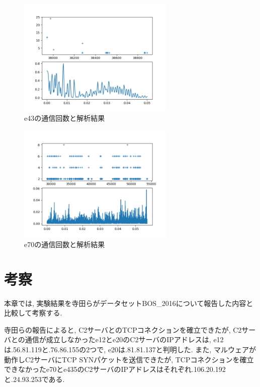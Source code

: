 \documentclass[twocolumn,10pt]{ltjsarticle}
\begin{document}
\begin{figure}[htbp]
    \centering

    \includegraphics[width=7.5cm]{images/【実験】BOS_2016の周期分析結果の比較/e43.png}

    \caption{e43の通信回数と解析結果}
    \label{fig:e43_result}
\end{figure}

\begin{figure}[htbp]
    \centering

    \includegraphics[width=7.5cm]{images/【実験】BOS_2016の周期分析結果の比較/e70.png}

    \caption{e70の通信回数と解析結果}
    \label{fig:e70_result}
\end{figure}

\section{考察}
本章では, 実験結果を寺田らがデータセットBOS\_2016について報告した内容\cite{weko_175829_1}と比較して考察する. 

寺田らの報告によると, C2サーバとのTCPコネクションを確立できたが, C2サーバとの通信が成立しなかったe12とe20のC2サーバのIPアドレスは, e12は\ast\ast\ast.56.81.119と\ast\ast\ast.76.86.155の2つで, e20は\ast\ast\ast.81.81.137と判明した. また, マルウェアが動作しC2サーバにTCP SYNパケットを送信できたが, TCPコネクションを確立できなかったe70とe435のC2サーバのIPアドレスはそれぞれ\ast\ast\ast.106.20.192と\ast\ast\ast.24.93.253である. 
\end{document}

